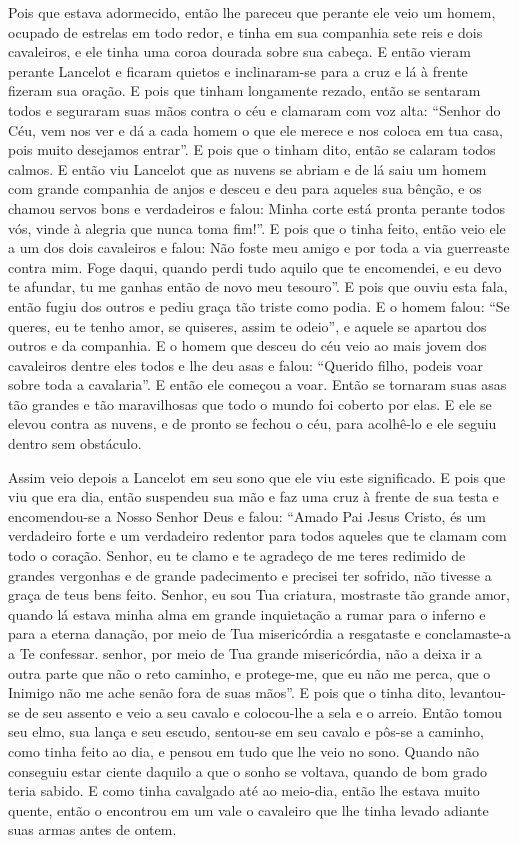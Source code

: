 Pois que estava adormecido, então lhe pareceu que perante ele veio um homem,
ocupado de estrelas em todo redor, e tinha em sua companhia sete reis e dois
cavaleiros, e ele tinha uma coroa dourada sobre sua cabeça. E então vieram
perante Lancelot e ficaram quietos e inclinaram-se para a cruz e lá à frente
fizeram sua oração. E pois que tinham longamente rezado, então se sentaram
todos e seguraram suas mãos contra o céu e clamaram com voz alta: “Senhor do
Céu, vem nos ver e dá a cada homem o que ele merece e nos coloca em tua casa,
pois muito desejamos entrar”. E pois que o tinham dito, então se calaram todos
calmos. E então viu Lancelot que as nuvens se abriam e de lá saiu um homem com
grande companhia de anjos e desceu e deu para aqueles sua bênção, e os chamou
servos bons e verdadeiros e falou: Minha corte está pronta perante todos vós,
vinde à alegria que nunca toma fim!”. E pois que o tinha feito, então veio ele
a um dos dois cavaleiros e falou: Não foste meu amigo e por toda a via
guerreaste contra mim. Foge daqui, quando perdi tudo aquilo que te encomendei,
e eu devo te afundar, tu me ganhas então de novo meu tesouro”. E pois que ouviu
esta fala, então fugiu dos outros e pediu graça tão triste como podia. E o
homem falou: “Se queres, eu te tenho amor, se quiseres, assim te odeio”, e
aquele se apartou dos outros e da companhia. E o homem que desceu do céu veio
ao mais jovem dos cavaleiros dentre eles todos e lhe deu asas e falou: “Querido
filho, podeis voar sobre toda a cavalaria”. E então ele começou a voar. Então
se tornaram suas asas tão grandes e tão maravilhosas que todo o mundo foi
coberto por elas. E ele se elevou contra as nuvens, e de pronto se fechou o
céu, para acolhê-lo e ele seguiu dentro sem obstáculo. 

Assim veio depois a Lancelot em seu sono que ele viu este significado. E
pois que viu que era dia, então suspendeu sua mão e faz uma cruz à frente de
sua testa e encomendou-se a Nosso Senhor Deus e falou: “Amado Pai Jesus Cristo,
és um verdadeiro forte e um verdadeiro redentor para todos aqueles que te
clamam com todo o coração. Senhor, eu te clamo e te agradeço de me teres
redimido de grandes vergonhas e de grande padecimento e precisei ter sofrido,
não tivesse a graça de teus bens feito. Senhor, eu sou Tua criatura, mostraste
tão grande amor, quando lá estava minha alma em grande inquietação a rumar para
o inferno e para a eterna danação, por meio de Tua misericórdia a resgataste e
conclamaste-a a Te confessar. senhor, por meio de Tua grande misericórdia, não
a deixa ir a outra parte que não o reto caminho, e protege-me, que eu não me
perca, que o Inimigo não me ache senão fora de suas mãos”. E pois que o tinha
dito, levantou-se de seu assento e veio a seu cavalo e colocou-lhe a sela e o
arreio. Então tomou seu elmo, sua lança e seu escudo, sentou-se em seu cavalo e
pôs-se a caminho, como tinha feito ao dia, e pensou em tudo que lhe veio no
sono. Quando não conseguiu estar ciente daquilo a que o sonho se voltava,
quando de bom grado teria sabido. E como tinha cavalgado até ao meio-dia, então
lhe estava muito quente, então o encontrou em um vale o cavaleiro que lhe tinha
levado adiante suas armas antes de ontem.

